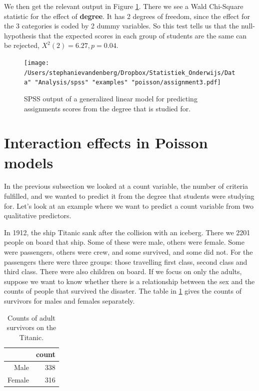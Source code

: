 \documentclass[]{book}\usepackage[]{graphicx}\usepackage[]{color}
\begin{document}
We then get the relevant output in Figure \ref{fig:assignment3}. There we see a Wald Chi-Square statistic for the effect of \textbf{degree}. It has 2 degrees of freedom, since the effect for the 3 categories is coded by 2 dummy variables. So this test tells us that the null-hypothesis that the expected scores in each group of students are the same can be rejected, $X^2(2)=6.27, p=0.04$.


\begin{figure}[h]
    \begin{center}
       \texttt{[image: /Users/stephanievandenberg/Dropbox/Statistiek\_Onderwijs/Data" "Analysis/spss" "examples" "poisson/assignment3.pdf]}
    \end{center}
     \caption{SPSS output of a generalized linear model for predicting assignments scores from the degree that is studied for.}
    \label{fig:assignment3}
\end{figure}


\section{Interaction effects in Poisson models}

In the previous subsection we looked at a count variable, the number of criteria fulfilled, and we wanted to predict it from the degree that students were studying for. Let's look at an example where we want to predict a count variable from two qualitative predictors.

In 1912, the ship Titanic sank after the collision with an iceberg. There we 2201 people on board that ship. Some of these were male, others were female. Some were passengers, others were crew, and some survived, and some did not. For the passengers there were three groups: those travelling first class, second class and third class. There were also children on board. If we focus on only the adults, suppose we want to know whether there is a relationship between the sex and the counts of people that survived the disaster. The table in \ref{tab:gen_20} gives the counts of survivors for males and females separately.


\begin{table}[ht]
\centering
\caption{Counts of adult survivors on the Titanic.} 
\label{tab:gen_20}
\begin{tabular}{rr}
  \hline
 & count \\ 
  \hline
Male & 338 \\ 
  Female & 316 \\ 
   \hline
\end{tabular}
\end{table}
\end{document}
